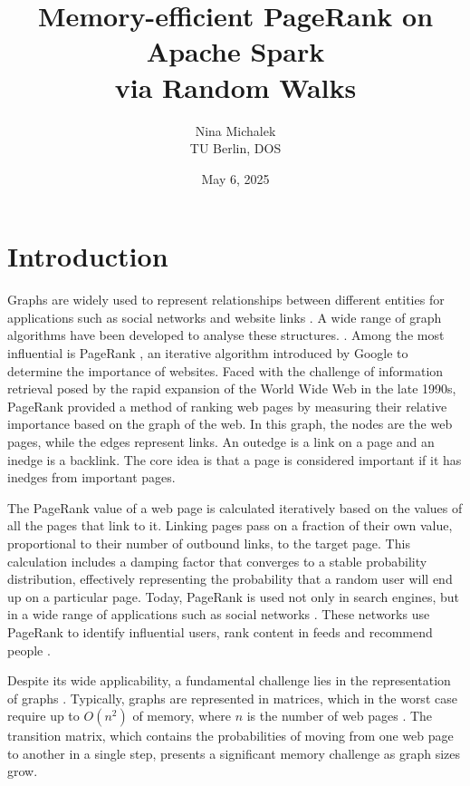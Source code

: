 \documentclass[a4paper,12pt]{article}
\title{Memory-efficient PageRank on Apache Spark\\ via Random Walks}
\author{Nina Michalek\\TU Berlin, DOS}
\date{May 6, 2025}
\begin{document}
\maketitle


\section{Introduction}
 Graphs are widely used to represent relationships between different entities for applications such as social networks and website links \cite{zhang_distributed_2021}. 
A wide range of graph algorithms have been developed to analyse these structures. \cite{malewicz_pregel_2010}\cite{low_distributed_2012}\cite{koch_empirical_2016}. Among the most influential is PageRank \cite{page_pagerank_1999}, an iterative algorithm introduced by Google to determine the importance of websites. Faced with the challenge of information retrieval posed by the rapid expansion of the World Wide Web in the late 1990s, PageRank provided a method of ranking web pages by measuring their relative importance based on the graph of the web. In this graph, the nodes are the web pages, while the edges represent links. An outedge is a link on a page and an inedge is a backlink. The core idea is that a page is considered important if it has inedges from important pages.\par
The PageRank value of a web page is calculated iteratively based on the values of all the pages that link to it. Linking pages pass on a fraction of their own value, proportional to their number of outbound links, to the target page. This calculation includes a damping factor that converges to a stable probability distribution, effectively representing the probability that a random user will end up on a particular page.
Today, PageRank is used not only in search engines, but in a wide range of applications such as social networks \cite{wu_efficient_2024}. These networks use PageRank to identify influential users, rank content in feeds and recommend people \cite{weng_twitterrank_2010}.\par
Despite its wide applicability, a fundamental challenge lies in the representation of graphs \cite{liu_fast_2015}. Typically, graphs are represented in matrices, which in the worst case require up to $O(n^2)$ of memory, where $n$ is the number of web pages \cite{wu_efficient_2024}. The transition matrix, which contains the probabilities of moving from one web page to another in a single step, presents a significant memory challenge as graph sizes grow.\par
\end{document}
